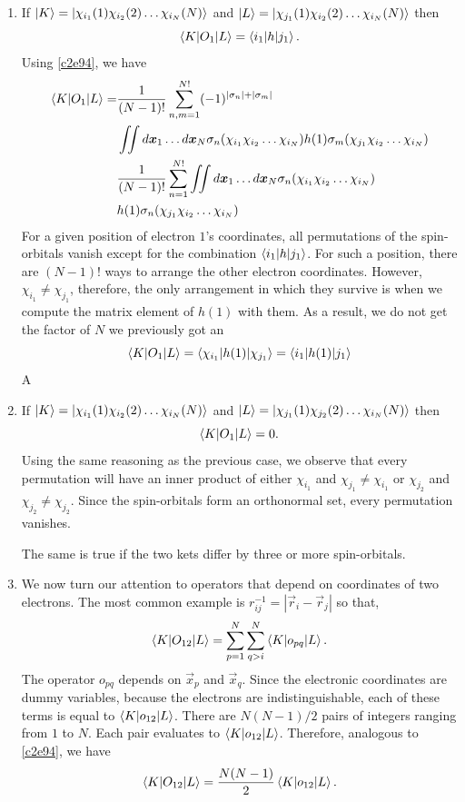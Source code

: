 \begin{enumerate}
\item\label{c2r4} If $\ket{K}=\ket{\chi_{i_1}(1)\chi_{i_2}(2)\ldots\chi_{i_N}(N)}$ and
$\ket{L}=\ket{\chi_{j_1}(1)\chi_{i_2}(2)\ldots\chi_{i_N}(N)}$ then
\[
\braket{K|O_1|L} = \braket{i_1|h|j_1}.
\]
Using \eqref{c2e94}, we have
\[
\begin{aligned}
\braket{K|O_1|L}=&\frac{1}{(N-1)!}\sum_{n,m=1}^{N!}(-1)^{|\sigma_n|+|\sigma_m|}\\
 &\iint d\bm{x}_1\ldots d\bm{x}_N\sigma_n(\chi_{i_1}\chi_{i_2}\ldots\chi_{i_N})
 h(1)\sigma_m(\chi_{j_1}\chi_{i_2}\ldots\chi_{i_N}) \\
 &\frac{1}{(N-1)!}\sum_{n=1}^{N!}
\iint d\bm{x}_1\ldots d\bm{x}_N\sigma_n(\chi_{i_1}\chi_{i_2}\ldots\chi_{i_N})\\
& h(1)\sigma_n(\chi_{j_1}\chi_{i_2}\ldots\chi_{i_N}) \\
\end{aligned}
\]
For a given position of electron $1$'s coordinates, all permutations of the
spin-orbitals vanish except for the combination $\braket{i_1|h|j_1}$. For such 
a position, there are $(N-1)!$ ways to arrange the other electron coordinates.
However, $\chi_{i_1} \ne \chi_{j_1}$, therefore, the only arrangement in which
they survive is when we compute the matrix element of $h(1)$ with them. As a
result, we do not get the factor of $N$ we previously got an
\begin{equation}\label{c2e96}
\braket{K|O_1|L} = \braket{\chi_{i_1}|h(1)|\chi_{j_1}} = \braket{i_1|h(1)|j_1}
\end{equation}A

\item\label{c2r5} If $\ket{K}=\ket{\chi_{i_1}(1)\chi_{i_2}(2)\ldots\chi_{i_N}(N)}$ and
$\ket{L}=\ket{\chi_{j_1}(1)\chi_{j_2}(2)\ldots\chi_{i_N}(N)}$ then
\[
\braket{K|O_1|L} = 0.
\]
Using the same reasoning as the previous case, we observe that every permutation
will have an inner product of either $\chi_{i_1}$ and $\chi_{j_1} \ne \chi_{i_1}$
or $\chi_{j_2}$ and $\chi_{j_2} \ne \chi_{j_2}$. Since the spin-orbitals form 
an orthonormal set, every permutation vanishes.

The same is true if the two kets differ by three or more spin-orbitals.

\item\label{c2r6}  We now turn our attention to operators that depend on coordinates of
two electrons. The most common example is $r_{ij}^{-1} = |\vec{r}_i - \vec{r}_j|$
so that, 
\[
\braket{K|O_{12}|L} = \sum_{p=1}^N\sum_{q>i}^N\braket{K|o_{pq}|L}.
\]
The operator $o_{pq}$ depends on $\vec{x}_p$ and $\vec{x}_q$. Since the 
electronic coordinates are dummy variables, because the electrons are 
indistinguishable, each of these terms is equal to $\braket{K|o_{12}|L}$. There
are $N(N-1)/2$ pairs of integers ranging from $1$ to $N$. Each pair evaluates
to $\braket{K|o_{12}|L}$. Therefore, analogous to \eqref{c2e94}, we have
\begin{equation}\label{c2e97}
\braket{K|O_{12}|L} = \frac{N(N-1)}{2}\braket{K|o_{12}|L}.
\end{equation}


\end{enumerate}
